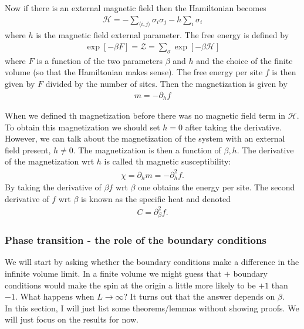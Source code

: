 \documentclass{book}
\theoremstyle{definition}
\newcommand{\p}{\partial}
\newcommand{\had}{\mathcal{H}}
\newcommand{\lb}{\left[}
\newcommand{\rb}{\right]}
\newcommand{\la}{\langle}
\newcommand{\ra}{\rangle}
\begin{document}
Now if there is an external magnetic field then the Hamiltonian becomes
\begin{align}
\had = -\sum_{\la i,j \ra} \sigma_i \sigma_j - h\sum_i \sigma_i 
\end{align}
where $h$ is the magnetic field external parameter. The free energy is defined by
\begin{align}
\exp\lb -\beta F \rb = \mathcal{Z} = \sum_\sigma \exp\lb -\beta \had \rb
\end{align}
where $F$ is a function of the two parameters $\beta$ and $h$ and the choice of the finite volume (so that the Hamiltonian makes sense). The free energy per site $f$ is then given by $F$ divided by the number of sites. Then the magnetization is given by
\begin{align}
m = -\p_h f
\end{align}




When we defined th magnetization before there was no magnetic field term in $\had$. To obtain this magnetization we should set $h=0$ after taking the derivative. However, we can talk about the magnetization of the system with an external field present, $h\neq 0$. The magnetization is then a function of $\beta,h$. The derivative of the magnetization wrt $h$ is called th magnetic susceptibility:
\begin{align}
\chi = \p_h m = -\p^2_h f.
\end{align}
By taking the derivative of $\beta f$ wrt $\beta$ one obtains the energy per site. The second derivative of $f$ wrt $\beta$ is known as the specific heat and denoted
\begin{align}
C = \p_\beta^2 f.
\end{align}


\subsubsection{Phase transition - the role of the boundary conditions}

We will start by asking whether the boundary conditions make a difference in the infinite volume limit. In a finite volume we might guess that $+$ boundary conditions would make the spin at the origin a little more likely to be $+1$ than $-1$. What happens when $L \to \infty$? It turns out that the answer depends on $\beta$. \\

In this section, I will just list some theorems/lemmas without showing proofs. We will just focus on the results for now. 
\end{document}
